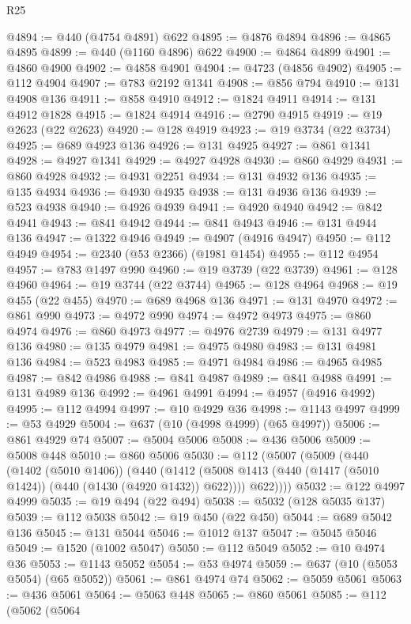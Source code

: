 \begin{lexlean}{R25}
\begin{coremodule}
@4894 := @440 (@4754 @4891) @622
@4895 := @4876 @4894
@4896 := @4865 @4895
@4899 := @440 (@1160 @4896) @622
@4900 := @4864 @4899
@4901 := @4860 @4900
@4902 := @4858 @4901
@4904 := @4723 (@4856 @4902)
@4905 := @112 @4904
@4907 := @783 @2192 @1341
@4908 := @856 @794
@4910 := @131 @4908 @136
@4911 := @858 @4910
@4912 := @1824 @4911
@4914 := @131 @4912 @1828
@4915 := @1824 @4914
@4916 := @2790 @4915
@4919 := @19 @2623 (@22 @2623)
@4920 := @128 @4919
@4923 := @19 @3734 (@22 @3734)
@4925 := @689 @4923 @136
@4926 := @131 @4925
@4927 := @861 @1341
@4928 := @4927 @1341
@4929 := @4927 @4928
@4930 := @860 @4929
@4931 := @860 @4928
@4932 := @4931 @2251
@4934 := @131 @4932 @136
@4935 := @135 @4934
@4936 := @4930 @4935
@4938 := @131 @4936 @136
@4939 := @523 @4938
@4940 := @4926 @4939
@4941 := @4920 @4940
@4942 := @842 @4941
@4943 := @841 @4942
@4944 := @841 @4943
@4946 := @131 @4944 @136
@4947 := @1322 @4946
@4949 := @4907 (@4916 @4947)
@4950 := @112 @4949
@4954 := @2340 (@53 @2366) (@1981 @1454)
@4955 := @112 @4954
@4957 := @783 @1497 @990
@4960 := @19 @3739 (@22 @3739)
@4961 := @128 @4960
@4964 := @19 @3744 (@22 @3744)
@4965 := @128 @4964
@4968 := @19 @455 (@22 @455)
@4970 := @689 @4968 @136
@4971 := @131 @4970
@4972 := @861 @990
@4973 := @4972 @990
@4974 := @4972 @4973
@4975 := @860 @4974
@4976 := @860 @4973
@4977 := @4976 @2739
@4979 := @131 @4977 @136
@4980 := @135 @4979
@4981 := @4975 @4980
@4983 := @131 @4981 @136
@4984 := @523 @4983
@4985 := @4971 @4984
@4986 := @4965 @4985
@4987 := @842 @4986
@4988 := @841 @4987
@4989 := @841 @4988
@4991 := @131 @4989 @136
@4992 := @4961 @4991
@4994 := @4957 (@4916 @4992)
@4995 := @112 @4994
@4997 := @10 @4929 @36
@4998 := @1143 @4997
@4999 := @53 @4929
@5004 := @637 (@10 (@4998 @4999) (@65 @4997))
@5006 := @861 @4929 @74
@5007 := @5004 @5006
@5008 := @436 @5006
@5009 := @5008 @448
@5010 := @860 @5006
@5030 := @112
    (@5007
      (@5009
        (@440
          (@1402 (@5010 @1406))
          (@440
            (@1412 (@5008 @1413 (@440 (@1417 (@5010 @1424)) (@440 (@1430 (@4920 @1432)) @622))))
            @622))))
@5032 := @122 @4997 @4999
@5035 := @19 @494 (@22 @494)
@5038 := @5032 (@128 @5035 @137)
@5039 := @112 @5038
@5042 := @19 @450 (@22 @450)
@5044 := @689 @5042 @136
@5045 := @131 @5044
@5046 := @1012 @137
@5047 := @5045 @5046
@5049 := @1520 (@1002 @5047)
@5050 := @112 @5049
@5052 := @10 @4974 @36
@5053 := @1143 @5052
@5054 := @53 @4974
@5059 := @637 (@10 (@5053 @5054) (@65 @5052))
@5061 := @861 @4974 @74
@5062 := @5059 @5061
@5063 := @436 @5061
@5064 := @5063 @448
@5065 := @860 @5061
@5085 := @112
    (@5062
      (@5064

\end{coremodule}
\end{lexlean}
